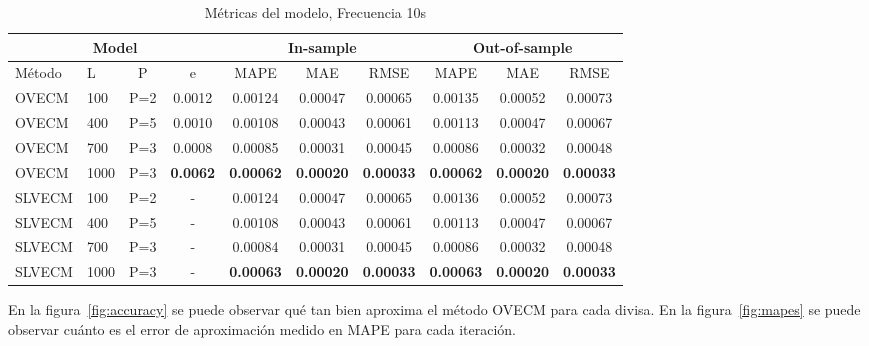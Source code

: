 \begin{table}[ht!]
\caption{Métricas del modelo, Frecuencia 10s}
\label{tab:mapes_10s}
\begin{center}
\begin{adjustbox}{max width=\textwidth}
\begin{tabular}{|l|l|c|c|c|c|c|c|c|c|}
\hline
\multicolumn{4}{|c|}{Model} & \multicolumn{3}{|c|}{In-sample} &
\multicolumn{3}{|c|}{Out-of-sample} \\ 
\hline
\hline
Método & L & P & e &
MAPE & MAE& RMSE&
MAPE & MAE& RMSE \\
\hline
 OVECM  &   100  &  P=2 &  0.0012  &  0.00124  &  0.00047  &  0.00065  &  0.00135  &  0.00052  &  0.00073 \\
 OVECM  &   400  &  P=5 &  0.0010  &  0.00108  &  0.00043  &  0.00061  &  0.00113  &  0.00047  &  0.00067 \\
 OVECM  &   700  &  P=3 &  0.0008  &  0.00085  &  0.00031  &  0.00045  &  0.00086  &  0.00032  &  0.00048 \\
 OVECM  &   1000 &  P=3 &  \textbf{0.0062}  &  \textbf{0.00062}  &  \textbf{0.00020}  &  \textbf{0.00033}  &  
      \textbf{0.00062}  &  \textbf{0.00020}  &  \textbf{0.00033} \\
\hline
 SLVECM  &   100 &  P=2 & -  &  0.00124  &  0.00047  &  0.00065  &  0.00136  &  0.00052  &  0.00073 \\
 SLVECM  &   400 &  P=5 & -  &  0.00108  &  0.00043  &  0.00061  &  0.00113  &  0.00047  &  0.00067 \\
 SLVECM  &   700 &  P=3 & -  &  0.00084  &  0.00031  &  0.00045  &  0.00086  &  0.00032  &  0.00048 \\
 SLVECM  &   1000 &  P=3& -  &  \textbf{0.00063}  &  \textbf{0.00020}  &  \textbf{0.00033}  &  
      \textbf{0.00063}  &  \textbf{0.00020}  &  \textbf{0.00033} \\
\hline
\end{tabular}
\end{adjustbox}
\end{center}
\end{table}

En la figura~\ref{fig:accuracy} se puede observar qué tan bien aproxima el
método OVECM para cada divisa. En la figura~\ref{fig:mapes} se puede observar
cuánto es el error de aproximación medido en MAPE para cada iteración.

